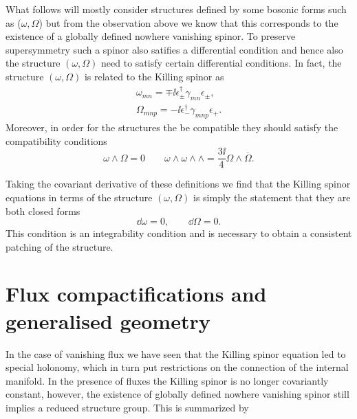 What follows will mostly consider structures defined by some bosonic forms such as ($\omega,\Omega$) but from the observation above we know that this corresponds to the existence of a globally defined nowhere vanishing spinor. To preserve supersymmetry such a spinor also satifies a differential condition and hence also the structure $(\omega,\Omega)$ need to satisfy certain differential conditions. In fact, the structure $(\omega,\Omega)$ is related to the Killing spinor as 
\begin{align}
    \omega_{mn} = \mp\ii \epsilon^\dagger_\pm\gamma_{mn}\epsilon_\pm,\\
    \Omega_{mnp} = -\ii\epsilon^\dagger_-\gamma_{mnp}\epsilon_+.
\end{align}
Moreover, in order for the structures the be compatible they should satisfy the compatibility conditions 
\begin{equation}\label{eq:CompatibilityCalabiYau}
    \omega\wedge\Omega = 0\qquad \omega\wedge\omega\wedge\wedge = \frac{3\ii}{4}\Omega\wedge\overbar{\Omega}.
\end{equation}

Taking the covariant derivative of these definitions we find that the Killing spinor equations in terms of the structure $(\omega,\Omega)$ is simply the statement that they are both closed forms 
\begin{equation}
    \dd \omega = 0, \qquad \dd \Omega = 0.
\end{equation}
This condition is an integrability condition and is necessary to obtain a consistent patching of the structure. %

\section{Flux compactifications and generalised geometry}
In the case of vanishing flux we have seen that the Killing spinor equation led to special holonomy, which in turn put restrictions on the connection of the internal manifold. In the presence of fluxes the Killing spinor is no longer covariantly constant, however, the existence of globally defined nowhere vanishing spinor still implies a reduced structure group. This is summarized by 

